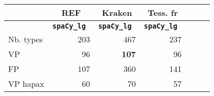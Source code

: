 
%
%
%
%
%


\footnotesize\begin{tabular}{|l|r|r|r|r|r|r|}
 \hline
 &\multicolumn{1}{c|}{REF}&\multicolumn{1}{c|}{Kraken} &\multicolumn{1}{c|}{Tess. fr}\\
\hline

  &\bf {\texttt{spaCy\_lg }}  &\bf {\texttt{spaCy\_lg }} &\bf {\texttt{spaCy\_lg }}\\

\hline
Nb. types & 203 & 467 & 237\\
VP & 96 & \textbf{107} & 96\\
FP & 107 & 360 & 141\\

\hline
\hline
VP hapax & 60 & 70 & 57\\
\hline

\end{tabular}